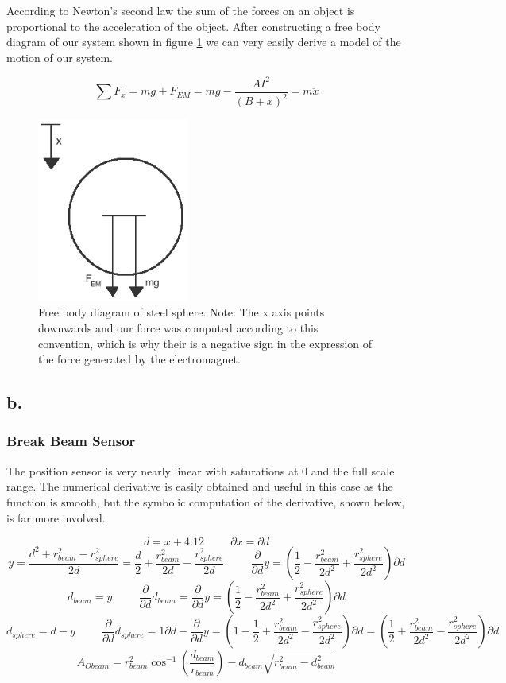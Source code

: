 \documentclass{article}
\theoremstyle{plain}
\theoremstyle{definition}
\theoremstyle{remark}
\begin{document}
According to Newton's second law the sum of the forces on an object is proportional to the acceleration of the object.  After constructing a free body diagram of our system shown in figure \ref{Q1_a4} we can very easily derive a model of the motion of our system.

$$ \sum F_x = mg + F_{EM} = mg -\frac{A I^2}{(B+x)^2} = m  \ddot{x}$$

\begin{figure}
\begin{center}
\includegraphics[width = 5cm]{freebodydiagram.png}
\caption{Free body diagram of steel sphere.  Note: The x axis points downwards and our force was computed according to this convention, which is why their is a negative sign in the expression of the force generated by the electromagnet.}
\label{Q1_a4}
\end{center}
\end{figure}

\subsection*{b.}
\subsubsection*{Break Beam Sensor}
The position sensor is very nearly linear with saturations at 0 and the full scale range.  The numerical derivative is easily obtained and useful in this case as the function is smooth, but the symbolic computation of the derivative, shown below, is far more involved. 

$$ d = x + 4.12 \hspace{1cm} \partial x=\partial d $$
$$ y = \frac{d^2+r_{beam}^2-r_{sphere}^2}{2d}=\frac{d}{2} + \frac{r_{beam}^2}{2d} - \frac{r_{sphere}^2}{2d} \hspace{1cm} \frac{\partial}{\partial d} y = \left(\frac{1}{2}  -\frac{r_{beam}^2}{2d^2} + \frac{r_{sphere}^2}{2d^2}\right) \partial d $$
$$ d_{beam}=y \hspace{1cm} \frac{\partial}{\partial d} d_{beam} =  \frac{\partial}{\partial d} y = \left(\frac{1}{2}  -\frac{r_{beam}^2}{2d^2} + \frac{r_{sphere}^2}{2d^2}\right) \partial d $$
$$  d_{sphere}=d-y \hspace{1cm}   \frac{\partial}{\partial d} d_{sphere} = 1\partial d - \frac{\partial}{\partial d} y = \left(1 - \frac{1}{2}  +\frac{r_{beam}^2}{2d^2} - \frac{r_{sphere}^2}{2d^2}\right) \partial d = \left(\frac{1}{2}  +\frac{r_{beam}^2}{2d^2} - \frac{r_{sphere}^2}{2d^2}\right) \partial d$$
$$ A_{Obeam} = r_{beam}^2 \cos^{-1} (\frac{d_{beam}}{r_{beam}})-d_{beam} \sqrt{r_{beam}^2-d_{beam}^2}$$ 
\end{document}
